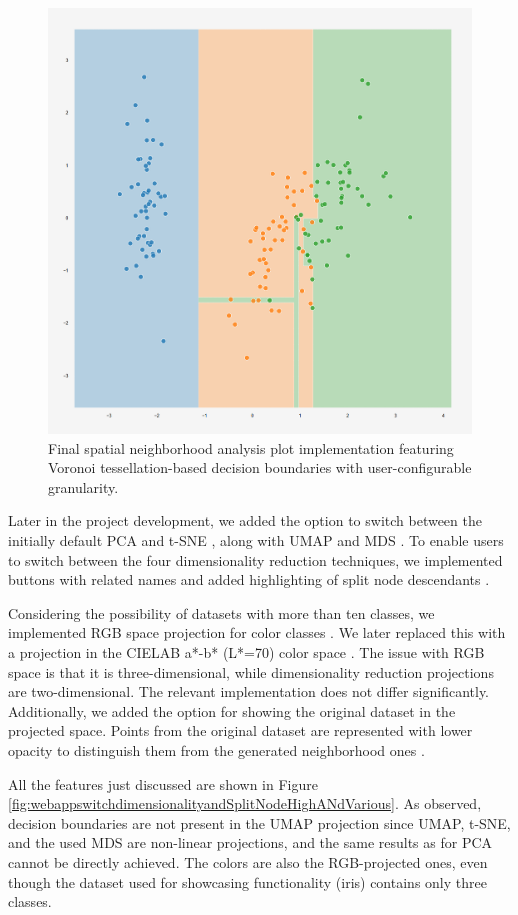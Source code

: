 \begin{figure}
    \centering
    \includegraphics[width=0.6\linewidth]{images/third scatter plot voronoi.png}
    \caption{Final spatial neighborhood analysis plot implementation featuring Voronoi tessellation-based decision boundaries with user-configurable granularity.}
    \label{fig:scatterplotvoronoi}
\end{figure}

Later in the project development, we added the option to switch between the initially default PCA and t-SNE \cite{git18commit}, along with UMAP and MDS \cite{git19commit}. To enable users to switch between the four dimensionality reduction techniques, we implemented buttons with related names \cite{git20commit} and added highlighting of split node descendants \cite{git21commit}. 

Considering the possibility of datasets with more than ten classes, we implemented RGB space projection for color classes \cite{git24commit}. We later replaced this with a projection in the CIELAB a*-b* (L*=70) color space \cite{git29commit}. The issue with RGB space is that it is three-dimensional, while dimensionality reduction projections are two-dimensional. The relevant implementation does not differ significantly. Additionally, we added the option for showing the original dataset in the projected space. Points from the original dataset are represented with lower opacity to distinguish them from the generated neighborhood ones \cite{git25commit}.

All the features just discussed are shown in Figure \ref{fig:webappswitchdimensionalityandSplitNodeHighANdVarious}. As observed, decision boundaries are not present in the UMAP projection since UMAP, t-SNE, and the used MDS are non-linear projections, and the same results as for PCA cannot be directly achieved. The colors are also the RGB-projected ones, even though the dataset used for showcasing functionality (iris) contains only three classes.

